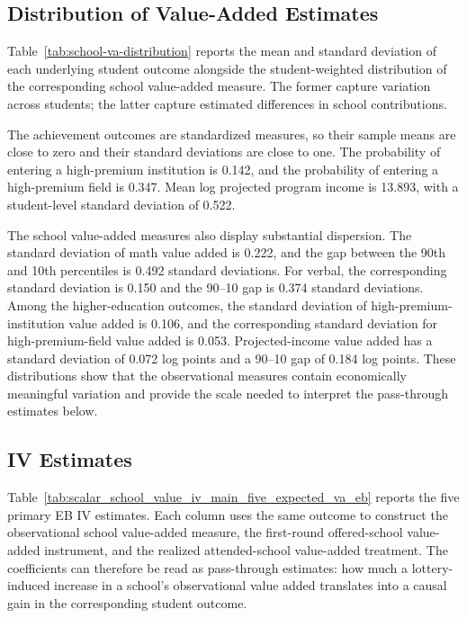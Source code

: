 \documentclass[a4paper, article, english, oneside, unknownkeysallowed, 12pt]{memoir}
\begin{document}
\subsection{Distribution of Value-Added Estimates}

Table~\ref{tab:school-va-distribution} reports the mean and standard deviation of each underlying student outcome alongside the student-weighted distribution of the corresponding school value-added measure.
The former capture variation across students; the latter capture estimated differences in school contributions.



The achievement outcomes are standardized measures, so their sample means are close to zero and their standard deviations are close to one.
The probability of entering a high-premium institution is 0.142, and the probability of entering a high-premium field is 0.347.
Mean log projected program income is 13.893, with a student-level standard deviation of 0.522.

The school value-added measures also display substantial dispersion.
The standard deviation of math value added is 0.222, and the gap between the 90th and 10th percentiles is 0.492 standard deviations.
For verbal, the corresponding standard deviation is 0.150 and the 90--10 gap is 0.374 standard deviations.
Among the higher-education outcomes, the standard deviation of high-premium-institution value added is 0.106, and the corresponding standard deviation for high-premium-field value added is 0.053.
Projected-income value added has a standard deviation of 0.072 log points and a 90--10 gap of 0.184 log points.
These distributions show that the observational measures contain economically meaningful variation and provide the scale needed to interpret the pass-through estimates below.

\subsection{IV Estimates}


Table~\ref{tab:scalar_school_value_iv_main_five_expected_va_eb} reports the five primary EB IV estimates.
Each column uses the same outcome to construct the observational school value-added measure, the first-round offered-school value-added instrument, and the realized attended-school value-added treatment.
The coefficients can therefore be read as pass-through estimates: how much a lottery-induced increase in a school's observational value added translates into a causal gain in the corresponding student outcome.
\end{document}
